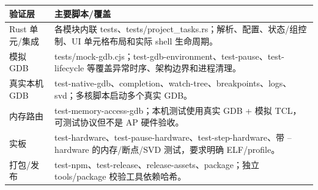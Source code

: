 \documentclass[UTF8,a4paper,11pt,oneside,fontset=none]{ctexart}
\begin{document}
\noindent\begin{tabularx}{\linewidth}{@{}P{34mm}Y@{}}\toprule
验证层 & 主要脚本/覆盖\\\midrule
Rust 单元/集成 & 各模块内联 tests、tests/project\_tasks.rs；解析、配置、状态/组控制、UI 单元格布局和实际 shell 生命周期。\\
模拟 GDB & tests/mock-gdb.cjs；test-gdb-environment、test-pause、test-lifecycle 等覆盖异常时序、架构边界和进程清理。\\
真实本机 GDB & test-native-gdb、completion、watch-tree、breakpoints、logs、svd；多核脚本启动多个真实 GDB。\\
内存路由 & test-memory-access-gdb；本机测试使用真实 GDB + 模拟 TCL，可测试协议但不是 AP 硬件验收。\\
实板 & test-hardware、test-pause-hardware、test-step-hardware、带 --hardware 的内存/断点/SVD 测试，要求明确 ELF/profile。\\
打包/发布 & test-npm、test-release、release-assets、package；独立 tools/package 校验工具依赖哈希。\\\bottomrule
\end{tabularx}
\end{document}
